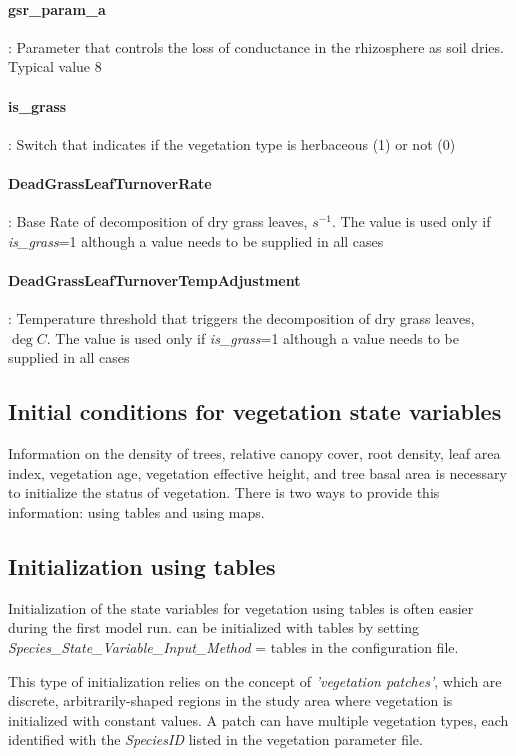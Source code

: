 \paragraph{gsr\_param\_a}: Parameter that controls the loss of conductance in the rhizosphere as soil dries. Typical value 8

\hangindent=0.7cm
\paragraph{is\_grass}: Switch that indicates if the vegetation type is herbaceous (1) or not (0)

\hangindent=0.7cm
\paragraph{DeadGrassLeafTurnoverRate}: Base Rate of decomposition of dry grass leaves,  $s^{-1}$. The value is used only if \emph{is\_grass}=1 although a value needs to be supplied in all cases 

\hangindent=0.7cm
\paragraph{DeadGrassLeafTurnoverTempAdjustment}: Temperature threshold that triggers the decomposition of dry grass leaves,  $\deg C$. The value is used only if \emph{is\_grass}=1 although a value needs to be supplied in all cases    
 

\subsection{Initial conditions for vegetation state variables}

Information on the density of trees, relative canopy cover, root density, leaf area index, vegetation age, vegetation effective height, and tree basal area is necessary to initialize the status of vegetation. There is two ways to provide this information: using tables and using maps. 

\subsection{Initialization using tables}
Initialization of the state variables for vegetation using tables is often easier during the first model run. \echo can be initialized with tables by setting \emph{Species\_State\_Variable\_Input\_Method} = tables in the configuration file. 

This type of initialization relies on the concept of \textit{'vegetation patches'}, which are discrete, arbitrarily-shaped regions in the study area where vegetation is initialized with constant values. A patch can have multiple vegetation types, each identified with the \emph{SpeciesID} listed in the vegetation parameter file.

